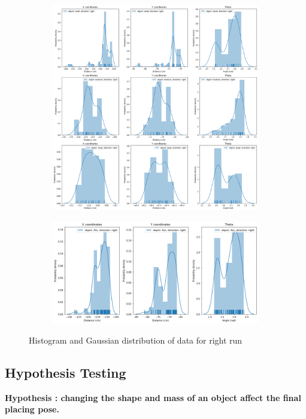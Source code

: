 \documentclass[10pt,a4paper]{article}
\begin{document}
					\begin{figure}[H]
						\begin{subfigure}{\textwidth}
							\centering
							\includegraphics[width=\linewidth]{img/right_hist.png}
						\end{subfigure}
						\begin{subfigure}{\textwidth}
							\centering
							\includegraphics[width=\linewidth]{img/right_hist_combined.png}
						\end{subfigure}
						\caption{Histogram and Gaussian distribution of data for right run}
					\end{figure}
					\subsection{{\color{blue}Hypothesis Testing}}
					\textbf{Hypothesis : changing the shape and mass of an object affect the final placing pose.}
					
\end{document}
